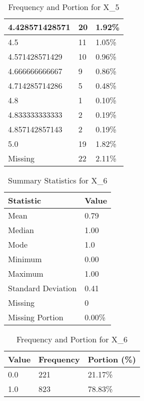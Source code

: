 \begin{table}[H]
\begin{tabular}{|l|l|l|}
4.428571428571 & 20 & 1.92\% \\ \hline
4.5 & 11 & 1.05\% \\ \hline
4.571428571429 & 10 & 0.96\% \\ \hline
4.666666666667 & 9 & 0.86\% \\ \hline
4.714285714286 & 5 & 0.48\% \\ \hline
4.8 & 1 & 0.10\% \\ \hline
4.833333333333 & 2 & 0.19\% \\ \hline
4.857142857143 & 2 & 0.19\% \\ \hline
5.0 & 19 & 1.82\% \\ \hline
Missing & 22 & 2.11\% \\ \hline
\end{tabular}
\caption{Frequency and Portion for X_5}
\end{table}

\begin{table}[H]
\centering
\begin{tabular}{|l|l|}
\hline
\textbf{Statistic} & \textbf{Value} \\ \hline
Mean               & 0.79 \\ \hline
Median             & 1.00 \\ \hline
Mode               & 1.0 \\ \hline
Minimum            & 0.00 \\ \hline
Maximum            & 1.00 \\ \hline
Standard Deviation & 0.41 \\ \hline
Missing            & 0 \\ \hline
Missing Portion    & 0.00\% \\ \hline
\end{tabular}
\caption{Summary Statistics for X_6}
\end{table}

\begin{table}[H]
\centering
\begin{tabular}{|l|l|l|}
\hline
\textbf{Value} & \textbf{Frequency} & \textbf{Portion (\%)} \\ \hline
0.0 & 221 & 21.17\% \\ \hline
1.0 & 823 & 78.83\% \\ \hline
\end{tabular}
\caption{Frequency and Portion for X_6}
\end{table}

